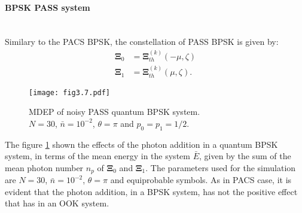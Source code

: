         \paragraph{BPSK PASS system}\mbox{}\\
        Similary to the PACS BPSK, the constellation of PASS BPSK is given by:
        \begin{equation}
            \begin{split}
                \pmb{\Xi}_0 &= \pmb{\Xi}_{th}^{(k)}(-\mu,\zeta)\\
                \pmb{\Xi}_1 &= \pmb{\Xi}_{th}^{(k)}(\mu,\zeta).
            \end{split}
        \end{equation}
        \begin{figure}[ht]
            \begin{center}
                \texttt{[image: fig3.7.pdf]}
                \caption{MDEP of noisy PASS quantum BPSK system.\\
                $N=30$, $\bar{n}=10^{-2}$, $\theta=\pi$ and $p_0=p_1=1/2$.}
                \label{fig:3.7}
            \end{center}
        \end{figure}
        The figure \ref{fig:3.7} shown the effects of the photon addition in a quantum BPSK
        system, in terms of the mean energy in the system $\bar{E}$, given by the sum of 
        the mean photon number $n_p$ of $\pmb{\Xi}_0$ and $\pmb{\Xi}_1$. The parameters used
        for the simulation are $N=30$, $\bar{n}=10^{-2}$, $\theta=\pi$ and equiprobable symbols.
        As in PACS case, it is evident that the photon addition, in a BPSK system, has not
        the positive effect that has in an OOK system.